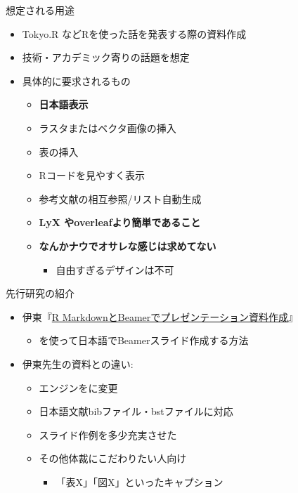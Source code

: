 \documentclass[
  12pt,
  ignorenonframetext,
]{beamer}
\providecommand{\tightlist}{%
  \setlength{\itemsep}{0pt}\setlength{\parskip}{0pt}}
\begin{document}
\begin{frame}{想定される用途}
\protect\hypertarget{ux60f3ux5b9aux3055ux308cux308bux7528ux9014}{}

\begin{itemize}
\tightlist
\item
  Tokyo.R などRを使った話を発表する際の資料作成
\item
  技術・アカデミック寄りの話題を想定
\item
  具体的に要求されるもの

  \begin{itemize}
  \tightlist
  \item
    \textbf{日本語表示}
  \item
    ラスタまたはベクタ画像の挿入
  \item
    表の挿入
  \item
    Rコードを見やすく表示
  \item
    参考文献の相互参照/リスト自動生成
  \item
    \textbf{LyX やoverleafより簡単であること}
  \item
    \textbf{なんかナウでオサレな感じは求めてない}

    \begin{itemize}
    \tightlist
    \item
      自由すぎるデザインは不可
    \end{itemize}
  \end{itemize}
\end{itemize}

\end{frame}

\begin{frame}{先行研究の紹介}
\protect\hypertarget{ux5148ux884cux7814ux7a76ux306eux7d39ux4ecb}{}

\begin{itemize}
\tightlist
\item
  伊東『\href{https://www.slideshare.net/hirokito/r-markdownbeamer-88777082}{R
  MarkdownとBeamerでプレゼンテーション資料作成}』

  \begin{itemize}
  \tightlist
  \item
    \LuaLaTeX を使って日本語でBeamerスライド作成する方法
  \end{itemize}
\item
  伊東先生の資料との違い:

  \begin{itemize}
  \tightlist
  \item
    エンジンを\XeLaTeX に変更
  \item
    日本語文献bibファイル・bstファイルに対応
  \item
    スライド作例を多少充実させた
  \item
    その他体裁にこだわりたい人向け

    \begin{itemize}
    \tightlist
    \item
      「表X」「図X」といったキャプション
    \end{itemize}
  \end{itemize}
\end{itemize}

\end{frame}
\end{document}
